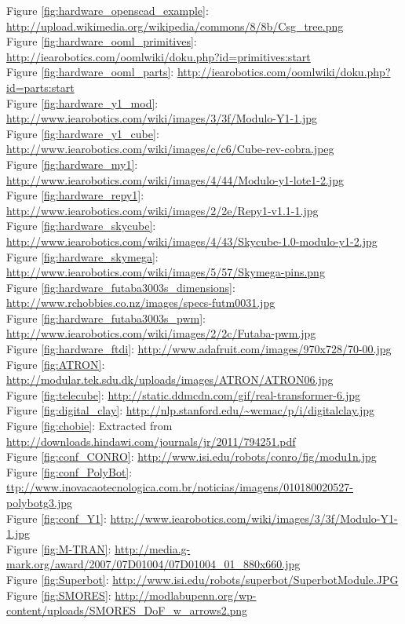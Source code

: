 \noindent
Figure \ref{fig:hardware_openscad_example}: \url{http://upload.wikimedia.org/wikipedia/commons/8/8b/Csg_tree.png}\\
Figure \ref{fig:hardware_ooml_primitives}: \url{http://iearobotics.com/oomlwiki/doku.php?id=primitives:start}\\
Figure \ref{fig:hardware_ooml_parts}: \url{http://iearobotics.com/oomlwiki/doku.php?id=parts:start}\\
Figure \ref{fig:hardware_y1_mod}: \url{http://www.iearobotics.com/wiki/images/3/3f/Modulo-Y1-1.jpg}\\
Figure \ref{fig:hardware_y1_cube}: \url{http://www.iearobotics.com/wiki/images/c/c6/Cube-rev-cobra.jpeg}\\
Figure \ref{fig:hardware_my1}: \url{http://www.iearobotics.com/wiki/images/4/44/Modulo-y1-lote1-2.jpg}\\
Figure \ref{fig:hardware_repy1}: \url{http://www.iearobotics.com/wiki/images/2/2e/Repy1-v1.1-1.jpg}\\
Figure \ref{fig:hardware_skycube}: \url{http://www.iearobotics.com/wiki/images/4/43/Skycube-1.0-modulo-y1-2.jpg}\\
Figure \ref{fig:hardware_skymega}: \url{http://www.iearobotics.com/wiki/images/5/57/Skymega-pins.png}\\
Figure \ref{fig:hardware_futaba3003s_dimensions}: \url{http://www.rchobbies.co.nz/images/specs-futm0031.jpg}\\
Figure \ref{fig:hardware_futaba3003s_pwm}: \url{http://www.iearobotics.com/wiki/images/2/2c/Futaba-pwm.jpg}\\
Figure \ref{fig:hardware_ftdi}: \url{http://www.adafruit.com/images/970x728/70-00.jpg}\\

\noindent       
Figure \ref{fig:ATRON}: \url{http://modular.tek.sdu.dk/uploads/images/ATRON/ATRON06.jpg}\\
Figure \ref{fig:telecube}: \url{http://static.ddmcdn.com/gif/real-transformer-6.jpg}\\
Figure \ref{fig:digital_clay}: \url{http://nlp.stanford.edu/~wcmac/p/i/digitalclay.jpg}\\
Figure \ref{fig:chobie}: Extracted from \url{http://downloads.hindawi.com/journals/jr/2011/794251.pdf}\\
Figure \ref{fig:conf_CONRO}: \url{http://www.isi.edu/robots/conro/fig/modu1n.jpg}\\
Figure \ref{fig:conf_PolyBot}: \url{ttp://www.inovacaotecnologica.com.br/noticias/imagens/010180020527-polybotg3.jpg}\\
Figure \ref{fig:conf_Y1}: \url{http://www.iearobotics.com/wiki/images/3/3f/Modulo-Y1-1.jpg}\\
Figure \ref{fig:M-TRAN}: \url{http://media.g-mark.org/award/2007/07D01004/07D01004_01_880x660.jpg}\\
Figure \ref{fig:Superbot}: \url{http://www.isi.edu/robots/superbot/SuperbotModule.JPG}\\
Figure \ref{fig:SMORES}: \url{http://modlabupenn.org/wp-content/uploads/SMORES_DoF_w_arrows2.png}\\
